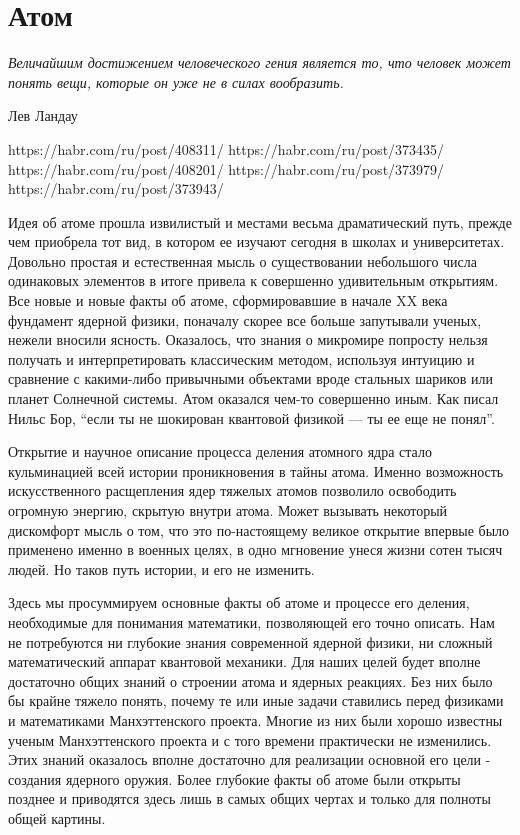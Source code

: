 \chapter{Атом}\label{ch:atom}

\epigraph{\emph{Величайшим достижением человеческого гения является то, что человек может понять вещи, которые он уже не в силах вообразить.}}
{Лев Ландау}

https://habr.com/ru/post/408311/
https://habr.com/ru/post/373435/
https://habr.com/ru/post/408201/
https://habr.com/ru/post/373979/
https://habr.com/ru/post/373943/


Идея об атоме прошла извилистый и местами весьма драматический путь, прежде чем приобрела тот вид, в котором ее изучают сегодня в школах и университетах.
Довольно простая и естественная мысль о существовании небольшого числа одинаковых элементов в итоге привела к совершенно удивительным открытиям.
Все новые и новые факты об атоме, сформировавшие в начале XX века фундамент ядерной физики, поначалу скорее все больше запутывали ученых, нежели вносили ясность.
Оказалось, что знания о микромире попросту нельзя получать и интерпретировать классическим методом, используя интуицию и сравнение с какими-либо привычными объектами вроде стальных шариков или планет Солнечной системы.
Атом оказался чем-то совершенно иным.
Как писал Нильс Бор, ``если ты не шокирован квантовой физикой — ты ее еще не понял''.

Открытие и научное описание процесса деления атомного ядра стало кульминацией всей истории проникновения в тайны атома. 
Именно возможность искусственного расщепления ядер тяжелых атомов позволило освободить огромную энергию, скрытую внутри атома.
Может вызывать некоторый дискомфорт мысль о том, что это по-настоящему великое открытие впервые было применено именно в военных целях, в одно мгновение унеся жизни сотен тысяч людей.
Но таков путь истории, и его не изменить.

Здесь мы просуммируем основные факты об атоме и процессе его деления, необходимые для понимания математики, позволяющей его точно описать.
Нам не потребуются ни глубокие знания современной ядерной физики, ни сложный математический аппарат квантовой механики.
Для наших целей будет вполне достаточно общих знаний о строении атома и ядерных реакциях.
Без них было бы крайне тяжело понять, почему те или иные задачи ставились перед физиками и математиками Манхэттенского проекта.
Многие из них были хорошо известны ученым Манхэттенского проекта и с того времени практически не изменились.  
Этих знаний оказалось вполне достаточно для реализации основной его цели - создания ядерного оружия.
Более глубокие факты об атоме были открыты позднее и приводятся здесь лишь в самых общих чертах и только для полноты общей картины.


